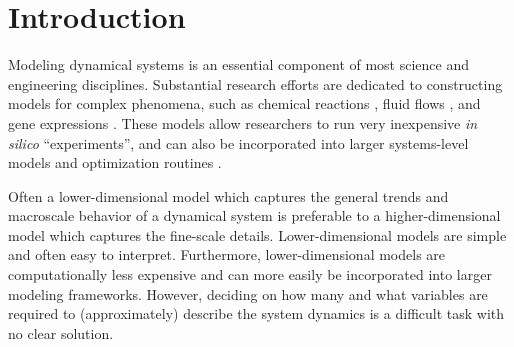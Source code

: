 

\chapter{Introduction\label{ch:intro}}

Modeling dynamical systems is an essential component of most science and engineering disciplines. 
%
Substantial research efforts are dedicated to constructing models for complex phenomena, such as chemical reactions \cite{dong2007simplification, gillespie1977exact, gallagher1986combined}, fluid flows \cite{anderson1995computational}, and gene expressions \cite{bar2004analyzing, storey2005significance}. 
%
These models allow researchers to run very inexpensive {\em in silico} ``experiments'', and can also be incorporated into larger systems-level models and optimization routines \cite{daoutidis2013engineering, oluwole2006rigorous, rubert2014advanced}. 

Often a lower-dimensional model which captures the general trends and macroscale behavior of a dynamical system is preferable to a higher-dimensional model which captures the fine-scale details. 
%
Lower-dimensional models are simple and often easy to interpret.
%
Furthermore, lower-dimensional models are computationally less expensive and can more easily be incorporated into larger modeling frameworks. 
%
However, deciding on how many and what variables are required to (approximately) describe the system dynamics is a difficult task with no clear solution. 






